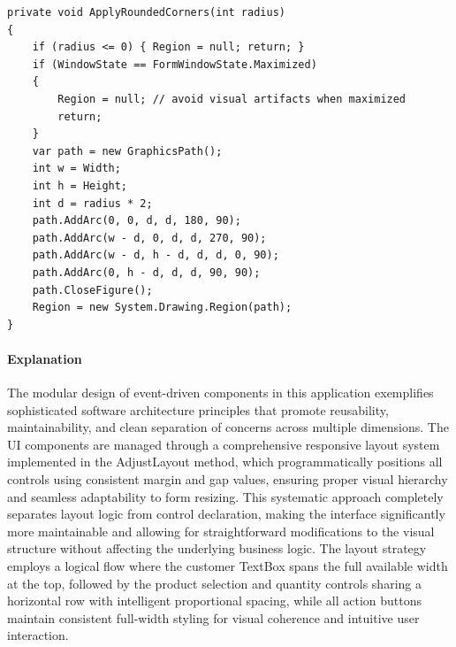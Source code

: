 \begin{lstlisting}[language=CSharp, caption={Complete UI Layout and Enhancement Implementation}]
private void ApplyRoundedCorners(int radius)
{
    if (radius <= 0) { Region = null; return; }
    if (WindowState == FormWindowState.Maximized)
    {
        Region = null; // avoid visual artifacts when maximized
        return;
    }
    var path = new GraphicsPath();
    int w = Width;
    int h = Height;
    int d = radius * 2;
    path.AddArc(0, 0, d, d, 180, 90);
    path.AddArc(w - d, 0, d, d, 270, 90);
    path.AddArc(w - d, h - d, d, d, 0, 90);
    path.AddArc(0, h - d, d, d, 90, 90);
    path.CloseFigure();
    Region = new System.Drawing.Region(path);
}
\end{lstlisting}

\paragraph{Explanation}
The modular design of event-driven components in this application exemplifies sophisticated software architecture principles that promote reusability, maintainability, and clean separation of concerns across multiple dimensions. The UI components are managed through a comprehensive responsive layout system implemented in the AdjustLayout method, which programmatically positions all controls using consistent margin and gap values, ensuring proper visual hierarchy and seamless adaptability to form resizing. This systematic approach completely separates layout logic from control declaration, making the interface significantly more maintainable and allowing for straightforward modifications to the visual structure without affecting the underlying business logic. The layout strategy employs a logical flow where the customer TextBox spans the full available width at the top, followed by the product selection and quantity controls sharing a horizontal row with intelligent proportional spacing, while all action buttons maintain consistent full-width styling for visual coherence and intuitive user interaction.

